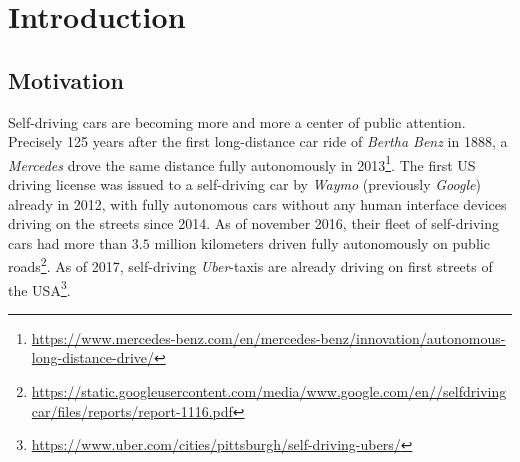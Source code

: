 
\chapter{Introduction} %

\label{ch:intro} %


\newcommand{\keyword}[1]{\textit{#1}}
\newcommand{\tabhead}[1]{\textbf{#1}}
\newcommand{\code}[1]{\texttt{#1}}
\newcommand{\file}[1]{\texttt{\bfseries#1}}
\newcommand{\option}[1]{\texttt{\itshape#1}}
\newcommand{\batchnorm}{batch normalization }
\newcommand{\Batchnorm}{Batch normalization }



\section{Motivation}

Self-driving cars are becoming more and more a center of public attention. Precisely 125 years after the first long-distance car ride of \keyword{Bertha Benz} in 1888, a \keyword{Mercedes} drove the same distance fully autonomously in 2013\footnote{\url{https://www.mercedes-benz.com/en/mercedes-benz/innovation/autonomous-long-distance-drive/}}.
The first US driving license was issued to a self-driving car by \keyword{Waymo} (previously \keyword{Google}) already in 2012, with fully autonomous cars without any human interface devices driving on the streets since 2014. As of november 2016, their fleet of self-driving cars had more than $3.5$ million kilometers driven fully autonomously on public roads\footnote{\url{https://static.googleusercontent.com/media/www.google.com/en//selfdrivingcar/files/reports/report-1116.pdf}}. As of 2017, self-driving \keyword{Uber}-taxis are already driving on first streets of the USA\footnote{\url{https://www.uber.com/cities/pittsburgh/self-driving-ubers/}}. 

